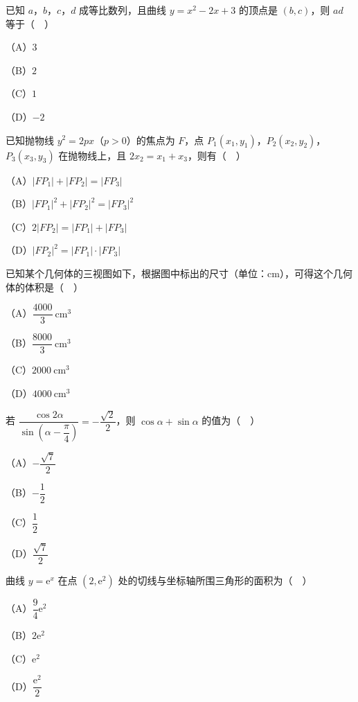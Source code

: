\begin{question}
已知 $a$，$b$，$c$，$d$ 成等比数列，且曲线 $y=x^2-2x+3$ 的顶点是 $(b,c)$，则 $ad$ 等于（　）

（A）$3$

（B）$2$

（C）$1$

（D）$-2$

\end{question}
\begin{question}
已知抛物线 $y^2=2px$（$p>0$）的焦点为 $F$，点 $P_1(x_1,y_1)$，$P_2(x_2,y_2)$，$P_3(x_3,y_3)$ 在抛物线上，且 $2x_2=x_1+x_3$，则有（　）

（A）$|FP_1|+|FP_2|=|FP_3|$

（B）$|FP_1|^2+|FP_2|^2=|FP_3|^2$

（C）$2|FP_2|=|FP_1|+|FP_3|$

（D）$|FP_2|^2=|FP_1|\cdot|FP_3|$

\Needspace{0.4\textheight}
\end{question}
\begin{question}
已知某个几何体的三视图如下，根据图中标出的尺寸（单位：$\mathrm{cm}$），可得这个几何体的体积是（　）
\nopagebreak[4]
\begin{center}\end{center}
\nopagebreak[4]
（A）$\dfrac{4000}{3}\ \mathrm{cm^3}$

（B）$\dfrac{8000}{3}\ \mathrm{cm^3}$

（C）$2000\ \mathrm{cm^3}$

（D）$4000\ \mathrm{cm^3}$

\end{question}
\begin{question}
若 $\dfrac{\cos2\alpha}{\sin\left(\alpha-\dfrac{\pi}{4}\right)}=-\dfrac{\sqrt2}{2}$，则 $\cos\alpha+\sin\alpha$ 的值为（　）

（A）$-\dfrac{\sqrt7}{2}$

（B）$-\dfrac12$

（C）$\dfrac12$

（D）$\dfrac{\sqrt7}{2}$

\end{question}
\begin{question}
曲线 $y=\mathrm e^x$ 在点 $(2,\mathrm e^2)$ 处的切线与坐标轴所围三角形的面积为（　）

（A）$\dfrac94\mathrm e^2$

（B）$2\mathrm e^2$

（C）$\mathrm e^2$

（D）$\dfrac{\mathrm e^2}{2}$

\end{question}
